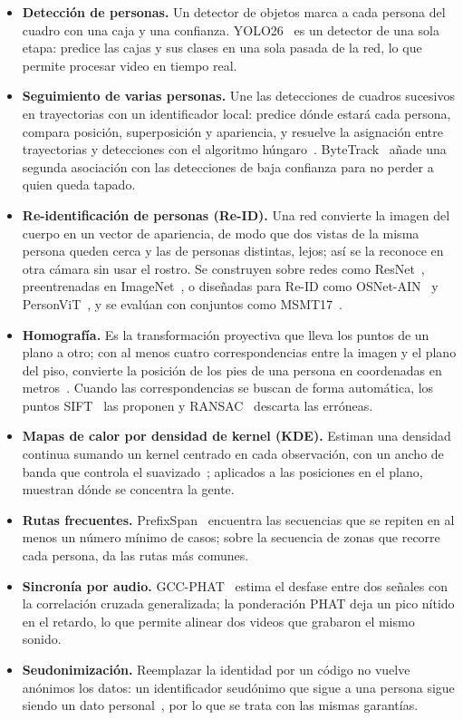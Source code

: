 \documentclass[12pt,a4paper]{article}
\begin{document}
\begin{itemize}
    \item \textbf{Detección de personas.} Un detector de objetos marca a cada
    persona del cuadro con una caja y una confianza. YOLO26~\cite{yolo26} es un
    detector de una sola etapa: predice las cajas y sus clases en una sola
    pasada de la red, lo que permite procesar video en tiempo real.
    \item \textbf{Seguimiento de varias personas.} Une las detecciones de
    cuadros sucesivos en trayectorias con un identificador local: predice
    dónde estará cada persona, compara posición, superposición y apariencia, y
    resuelve la asignación entre trayectorias y detecciones con el algoritmo
    húngaro~\cite{kuhn1955}. ByteTrack~\cite{zhang2022bytetrack} añade una
    segunda asociación con las detecciones de baja confianza para no perder a
    quien queda tapado.
    \item \textbf{Re-identificación de personas (Re-ID).} Una red convierte la
    imagen del cuerpo en un vector de apariencia, de modo que dos vistas de la
    misma persona queden cerca y las de personas distintas, lejos; así se la
    reconoce en otra cámara sin usar el rostro. Se construyen sobre redes como
    ResNet~\cite{he2016}, preentrenadas en ImageNet~\cite{deng2009}, o diseñadas
    para Re-ID como OSNet-AIN~\cite{zhou2022osnet} y
    PersonViT~\cite{hu2024personvit}, y se evalúan con conjuntos como
    MSMT17~\cite{wei2018}.
    \item \textbf{Homografía.} Es la transformación proyectiva que lleva los
    puntos de un plano a otro; con al menos cuatro correspondencias entre la
    imagen y el plano del piso, convierte la posición de los pies de una
    persona en coordenadas en metros~\cite{hartley2004}. Cuando las
    correspondencias se buscan de forma automática, los puntos
    SIFT~\cite{lowe2004} las proponen y RANSAC~\cite{fischler1981} descarta
    las erróneas.
    \item \textbf{Mapas de calor por densidad de kernel (KDE).} Estiman una
    densidad continua sumando un kernel centrado en cada observación, con un
    ancho de banda que controla el suavizado~\cite{parzen1962}; aplicados a
    las posiciones en el plano, muestran dónde se concentra la gente.
    \item \textbf{Rutas frecuentes.} PrefixSpan~\cite{pei2001} encuentra las
    secuencias que se repiten en al menos un número mínimo de casos; sobre la
    secuencia de zonas que recorre cada persona, da las rutas más comunes.
    \item \textbf{Sincronía por audio.} GCC-PHAT~\cite{knapp1976} estima el
    desfase entre dos señales con la correlación cruzada generalizada; la
    ponderación PHAT deja un pico nítido en el retardo, lo que permite alinear
    dos videos que grabaron el mismo sonido.
    \item \textbf{Seudonimización.} Reemplazar la identidad por un código no
    vuelve anónimos los datos: un identificador seudónimo que sigue a una
    persona sigue siendo un dato personal~\cite{gdpr}, por lo que se trata con
    las mismas garantías.
\end{itemize}
\end{document}

